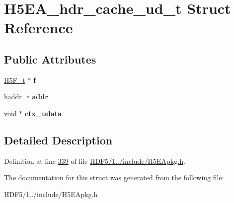 \hypertarget{struct_h5_e_a__hdr__cache__ud__t}{}\section{H5\+E\+A\+\_\+hdr\+\_\+cache\+\_\+ud\+\_\+t Struct Reference}
\label{struct_h5_e_a__hdr__cache__ud__t}
\subsection*{Public Attributes}
\begin{DoxyCompactItemize}
\item 
\mbox{\label{struct_h5_e_a__hdr__cache__ud__t_a55132ed7027a1564f4911b6a3e66a28e}} 
\hyperlink{struct_h5_f__t}{H5\+F\+\_\+t} $\ast$ {\bfseries f}
\item 
\mbox{\label{struct_h5_e_a__hdr__cache__ud__t_a2b6593164fcac20549d8d15866ad1030}} 
haddr\+\_\+t {\bfseries addr}
\item 
\mbox{\label{struct_h5_e_a__hdr__cache__ud__t_a280603d4cf0397769bb2016a06c15dc3}} 
void $\ast$ {\bfseries ctx\+\_\+udata}
\end{DoxyCompactItemize}


\subsection{Detailed Description}


Definition at line \hyperlink{_h_d_f5_21_810_81_2include_2_h5_e_apkg_8h_source_l00339}{339} of file \hyperlink{_h_d_f5_21_810_81_2include_2_h5_e_apkg_8h_source}{H\+D\+F5/1../include/\+H5\+E\+Apkg.\+h}.



The documentation for this struct was generated from the following file\+:\begin{DoxyCompactItemize}
\item 
H\+D\+F5/1../include/\+H5\+E\+Apkg.\+h\end{DoxyCompactItemize}

